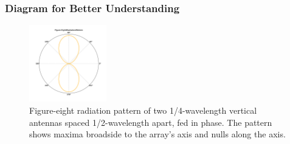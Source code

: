\subsubsection{Diagram for Better Understanding}

\begin{figure}
\centering
\includegraphics[width=0.3\textwidth]{questions/E9C/figure_eight_pattern.pdf}
\caption{Figure-eight radiation pattern of two 1/4-wavelength vertical antennas spaced 1/2-wavelength apart, fed in phase. The pattern shows maxima broadside to the array's axis and nulls along the axis.}
\end{figure}
